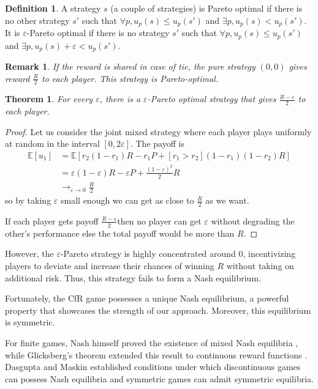 \documentclass[preprint,12pt,authoryear]{elsarticle}
\newtheorem{theorem}{Theorem}[section]
\newtheorem*{remark}{Remark}
\theoremstyle{definition}
\newtheorem{definition}{Definition}[section]
\begin{document}
\begin{definition}A strategy $s$ (a couple of strategies) is Pareto optimal if there is no other strategy $s'$ such that $\forall p, u_p(s) \le u_p(s')$ and $\exists p, u_p(s) < u_p(s')$. It is $\varepsilon$-Pareto optimal if there is no strategy $s'$ such that $\forall p, u_p(s) \le u_p(s')$ and $\exists p, u_p(s) + \varepsilon < u_p(s')$.
\end{definition}
\begin{remark} If the reward is shared in case of tie, the pure strategy $(0,0)$ gives reward $\frac{R}{2}$ to each player. This strategy is Pareto-optimal.
\end{remark}
\begin{theorem}
\label{thm:pareto}
For every $\varepsilon$, there is a $\varepsilon$-Pareto optimal strategy that gives $\frac{R - \varepsilon}{2}$ to each player.
\end{theorem}
\begin{proof}
Let us consider the joint mixed strategy where each player plays uniformly at random in the interval $[0, 2 \varepsilon]$. The payoff is
\begin{align*} \mathbb{E}[u_1] &= \mathbb{E}\left[ r_2 (1-r_1) R - r_1 P + [ r_1 > r_2 ](1-r_1)(1-r_2) R\right] \\ &= \varepsilon (1-\varepsilon) R - \varepsilon P + \frac{(1-\varepsilon)^2}{2} R \\
&\rightarrow_{\varepsilon \rightarrow 0} \frac{R}{2} \end{align*}
so by taking $\varepsilon$ small enough we can get as close to $\frac{R}{2}$ as we want.

If each player gets payoff $\frac{R - \varepsilon}{2}$then no player can get $\varepsilon$ without degrading the other’s performance else the total payoff would be more than $R$.
\end{proof}

However, the $\varepsilon$-Pareto strategy is highly concentrated around $0$, incentivizing players to deviate and increase their chances of winning $R$ without taking on additional risk. Thus, this strategy fails to form a Nash equilibrium.

Fortunately, the CfR game possesses a unique Nash equilibrium, a powerful property that showcases the strength of our approach. Moreover, this equilibrium is symmetric.

For finite games, Nash himself proved the existence of mixed Nash equilibria \citep{Nash1950-jp}, while Glicksberg's theorem extended this result to continuous reward functions \citep{Glicksberg1951-wp}. Dasgupta and Maskin \citep{Dasgupta1986-gu} established conditions under which discontinuous games can possess Nash equilibria and symmetric games can admit symmetric equilibria.
\end{document}
